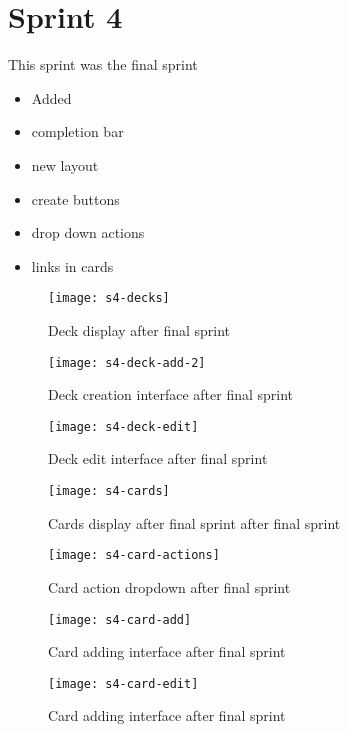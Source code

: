 \section{Sprint 4}
This sprint was the final sprint

\begin{itemize}
\item Added
\item completion bar
\item new layout
\item create buttons
\item drop down actions
\item links in cards
\end{itemize}

 \begin{figure}
\texttt{[image: s4-decks]}
\caption{Deck display after final sprint}
\centering
\end{figure}

 \begin{figure}
\texttt{[image: s4-deck-add-2]}
\caption{Deck creation interface after final sprint}
\centering
\end{figure}

 \begin{figure}
\texttt{[image: s4-deck-edit]}
\caption{Deck edit interface after final sprint}
\centering
\end{figure}


 \begin{figure}
\texttt{[image: s4-cards]}
\caption{Cards display after final sprint after final sprint}
\centering
\end{figure}

 \begin{figure}
\texttt{[image: s4-card-actions]}
\caption{Card action dropdown after final sprint}
\centering
\end{figure}

 \begin{figure}
\texttt{[image: s4-card-add]}
\caption{Card adding interface after final sprint}
\centering
\end{figure}

 \begin{figure}
\texttt{[image: s4-card-edit]}
\caption{Card adding interface after final sprint}
\centering
\end{figure}

